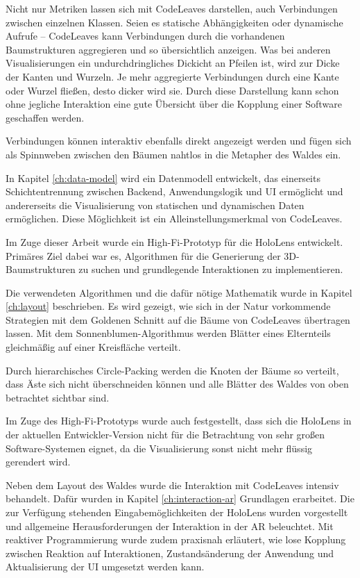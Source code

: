 Nicht nur Metriken lassen sich mit CodeLeaves darstellen, auch Verbindungen zwischen einzelnen Klassen. Seien es statische Abhängigkeiten oder dynamische Aufrufe -- CodeLeaves kann Verbindungen durch die vorhandenen Baumstrukturen aggregieren und so übersichtlich anzeigen. Was bei anderen Visualisierungen ein undurchdringliches Dickicht an Pfeilen ist, wird zur Dicke der Kanten und Wurzeln. Je mehr aggregierte Verbindungen durch eine Kante oder Wurzel fließen, desto dicker wird sie. Durch diese Darstellung kann schon ohne jegliche Interaktion eine gute Übersicht über die Kopplung einer Software geschaffen werden.

Verbindungen können interaktiv ebenfalls direkt angezeigt werden und fügen sich als Spinnweben zwischen den Bäumen nahtlos in die Metapher des Waldes ein.

In Kapitel \ref{ch:data-model} wird ein Datenmodell entwickelt, das einerseits Schichtentrennung zwischen Backend, Anwendungslogik und UI ermöglicht und andererseits die Visualisierung von statischen und dynamischen Daten ermöglichen. Diese Möglichkeit ist ein Alleinstellungsmerkmal von CodeLeaves.

Im Zuge dieser Arbeit wurde ein High-Fi-Prototyp für die HoloLens entwickelt. Primäres Ziel dabei war es, Algorithmen für die Generierung der 3D-Baumstrukturen zu suchen und grundlegende Interaktionen zu implementieren.

Die verwendeten Algorithmen und die dafür nötige Mathematik wurde in Kapitel \ref{ch:layout} beschrieben. Es wird gezeigt, wie sich in der Natur vorkommende Strategien mit dem Goldenen Schnitt auf die Bäume von CodeLeaves übertragen lassen. Mit dem Sonnenblumen-Algorithmus werden Blätter eines Elternteils gleichmäßig auf einer Kreisfläche verteilt.

Durch hierarchisches Circle-Packing werden die Knoten der Bäume so verteilt, dass Äste sich nicht überschneiden können und alle Blätter des Waldes von oben betrachtet sichtbar sind.

Im Zuge des High-Fi-Prototyps wurde auch festgestellt, dass sich die HoloLens in der aktuellen Entwickler-Version nicht für die Betrachtung von sehr großen Software-Systemen eignet, da die Visualisierung sonst nicht mehr flüssig gerendert wird.

Neben dem Layout des Waldes wurde die Interaktion mit CodeLeaves intensiv behandelt. Dafür wurden in Kapitel \ref{ch:interaction-ar} Grundlagen erarbeitet. Die zur Verfügung stehenden Eingabemöglichkeiten der HoloLens wurden vorgestellt und allgemeine Herausforderungen der Interaktion in der AR beleuchtet. Mit reaktiver Programmierung wurde zudem praxisnah erläutert, wie lose Kopplung zwischen Reaktion auf Interaktionen, Zustandsänderung der Anwendung und Aktualisierung der UI umgesetzt werden kann.


